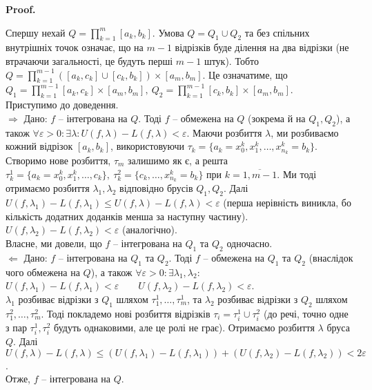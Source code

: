 \documentclass[a4paper, 10pt]{article}
\makeatletter
\def\qed{$\blacksquare$}
\def\rightproof{$\boxed{\Rightarrow}$ }
\def\leftproof{$\boxed{\Leftarrow}$ }
\theoremstyle{theoremdd}
\theoremstyle{theoremdd}
\theoremstyle{theoremdd}
\theoremstyle{theoremdd}
\theoremstyle{theoremdd}
\theoremstyle{theoremdd}
\theoremstyle{theoremdd}
\theoremstyle{theoremdd}
\theoremstyle{theoremdd}
\theoremstyle{theoremdd}
\theoremstyle{theoremdd}
\theoremstyle{theoremdd}
\theoremstyle{theoremdd}
\theoremstyle{theoremdd}
\theoremstyle{theoremdd}
\renewenvironment{proof}[1][Proof.\\]{\par
\pushQED{\hfill \qed}%
\normalfont \topsep6\p@\@plus6\p@\relax
\trivlist
\item\relax
{\bfseries
#1\@addpunct{.}}\hspace\labelsep\ignorespaces
}{%
\popQED\endtrivlist\@endpefalse
}
\makeatother
\begin{document}
\begin{proof}
Спершу нехай $Q = \displaystyle\prod_{k=1}^m [a_k,b_k]$. Умова $Q = Q_1 \cup Q_2$ та без спільних внутрішніх точок означає, що на $m-1$ відрізків буде ділення на два відрізки (не втрачаючи загальності, це будуть перші $m-1$ штук). Тобто $Q = \displaystyle\prod_{k=1}^{m-1} \left([a_k,c_k] \cup [c_k,b_k]\right) \times [a_m,b_m]$. Це означатиме, що\\
$Q_1 = \displaystyle\prod_{k=1}^{m-1} [a_k,c_k] \times [a_m,b_m],\ Q_2 = \displaystyle\prod_{k=1}^{m-1} [c_k,b_k] \times [a_m,b_m]$.\\
Приступимо до доведення.
\bigskip \\
\rightproof Дано: $f$ -- інтегрована на $Q$. Тоді $f$ -- обмежена на $Q$ (зокрема й на $Q_1,Q_2$), а також $\forall \varepsilon > 0: \exists \lambda: U(f,\lambda) - L(f,\lambda) < \varepsilon$. Маючи розбиття $\lambda$, ми розбиваємо кожний відрізок $[a_k,b_k]$, використовуючи $\tau_k = \{a_k = x_0^k, x_1^k, \dots, x_{n_k}^k = b_k\}$.\\
Створимо нове розбиття, $\tau_m$ залишимо як є, а решта $\tau_k^{1} = \{a_k = x_0^k, x_1^k, \dots, c_k\},\ \tau_k^{2} = \{c_k, \dots, x_{n_k}^k = b_k\}$ при $k = \overline{1,m-1}$. Ми тоді отримаємо розбиття $\lambda_1, \lambda_2$ відповідно брусів $Q_1,Q_2$. Далі\\
$U(f,\lambda_1) - L(f,\lambda_1) \leq U(f,\lambda) - L(f,\lambda) < \varepsilon$ (перша нерівність виникла, бо кількість додатних доданків менша за наступну частину).\\
$U(f,\lambda_2) - L(f,\lambda_2) < \varepsilon$ (аналогічно).\\
Власне, ми довели, що $f$ -- інтегрована на $Q_1$ та $Q_2$ одночасно.
\bigskip \\
\leftproof Дано: $f$ -- інтегрована на $Q_1$ та $Q_2$. Тоді $f$ -- обмежена на $Q_1$ та $Q_2$ (внаслідок чого обмежена на $Q$), а також $\forall \varepsilon > 0: \exists \lambda_1,\lambda_2:$\\
$U(f,\lambda_1) - L(f,\lambda_1) < \varepsilon \qquad U(f,\lambda_2) - L(f,\lambda_2) < \varepsilon$.\\
$\lambda_1$ розбиває відрізки з $Q_1$ шляхом $\tau_1^1,\dots,\tau_m^1$, та $\lambda_2$ розбиває відрізки з $Q_2$ шляхом $\tau_1^2,\dots,\tau_m^2$. Тоді покладемо нові розбиття відрізків $\tau_i = \tau_i^1 \cup \tau_i^2$ (до речі, точно одне з пар $\tau_i^1,\tau_i^2$ будуть однаковими, але це ролі не грає). Отримаємо розбиття $\lambda$ бруса $Q$. Далі\\
$U(f,\lambda) - L(f,\lambda) \leq (U(f,\lambda_1) - L(f,\lambda_1)) + (U(f,\lambda_2) - L(f,\lambda_2)) < 2 \varepsilon$.\\
Отже, $f$ -- інтегрована на $Q$.
\end{proof}
\end{document}

